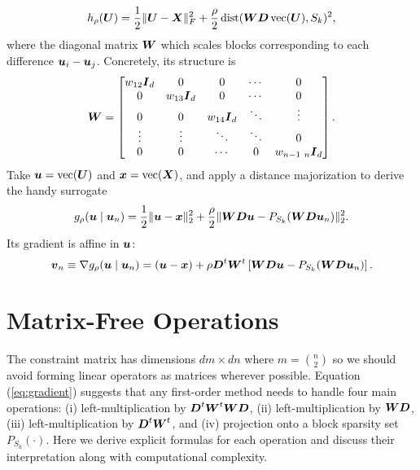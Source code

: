 \documentclass[11pt]{article}
\begin{document}
\begin{equation}
    \label{eq:penalized-loss}
    h_{\rho}(\boldsymbol{U})
    =
    \frac{1}{2}\|\boldsymbol{U} - \boldsymbol{X}\|_{F}^{2}
    +
    \frac{\rho}{2} \mathop{\rm dist}\nolimits(\boldsymbol{W} \boldsymbol{D} \mathop{\rm vec}\nolimits(\boldsymbol{U}), S_{k})^{2},
\end{equation}
where the diagonal matrix \(\boldsymbol{W}\) which scales blocks corresponding to each difference \(\boldsymbol{u}_{i} - \boldsymbol{u}_{j}\).
Concretely, its structure is
\begin{equation*}
    \boldsymbol{W}
    =
    \begin{bmatrix}
        w_{12} \boldsymbol{I}_{d} & 0 & 0 & \cdots & 0 \\
        0 & w_{13} \boldsymbol{I}_{d} & 0 & \cdots & 0 \\
        0 & 0 & w_{14} \boldsymbol{I}_{d} & \ddots & \vdots \\
        \vdots & \vdots & \ddots & \ddots & 0\\
        0 & 0 & \cdots & 0 & w_{n-1~n} \boldsymbol{I}_{d}
    \end{bmatrix}.
\end{equation*}
Take \(\boldsymbol{u} = \mathop{\rm vec}\nolimits(\boldsymbol{U})\) and \(\boldsymbol{x} = \mathop{\rm vec}\nolimits(\boldsymbol{X})\), and apply a distance majorization to derive the handy surrogate
\begin{equation}
    \label{eq:surrogate}
    g_{\rho}(\boldsymbol{u} \mid \boldsymbol{u}_{n})
    =
    \frac{1}{2}\|\boldsymbol{u} - \boldsymbol{x}\|_{2}^{2}
    +
    \frac{\rho}{2}
    \| \boldsymbol{W} \boldsymbol{D} \boldsymbol{u} - P_{S_{k}}(\boldsymbol{W} \boldsymbol{D} \boldsymbol{u}_{n}) \|_{2}^{2}.
\end{equation}
Its gradient is affine in \(\boldsymbol{u}\):
\begin{equation}
    \label{eq:gradient}
    \boldsymbol{v}_{n}
    \equiv
    \nabla g_{\rho}(\boldsymbol{u} \mid \boldsymbol{u}_{n})
    =
    (\boldsymbol{u} - \boldsymbol{x})
    +
    \rho \boldsymbol{D}^{t} \boldsymbol{W}^{t} \left[
        \boldsymbol{W} \boldsymbol{D} \boldsymbol{u} - P_{S_{k}}(\boldsymbol{W} \boldsymbol{D} \boldsymbol{u}_{n})
    \right].
\end{equation}

\section*{\center Matrix-Free Operations}

The constraint matrix has dimensions \(dm \times dn\) where \(m = \binom{n}{2}\) so we should avoid forming linear operators as matrices wherever possible.
Equation (\ref{eq:gradient}) suggests that any first-order method needs to handle four main operations: (i) left-multiplication by \(\boldsymbol{D}^{t} \boldsymbol{W}^{t} \boldsymbol{W} \boldsymbol{D}\), (ii) left-multiplication by \(\boldsymbol{W} \boldsymbol{D}\), (iii) left-multiplication by \(\boldsymbol{D}^{t} \boldsymbol{W}^{t}\), and (iv) projection onto a block sparsity set \(P_{S_{k}}(\cdot)\).
Here we derive explicit formulas for each operation and discuss their interpretation along with computational complexity.
\end{document}
